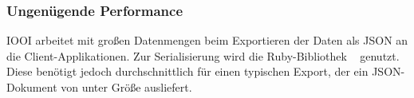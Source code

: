 \subsubsection{Ungenügende Performance}
\label{sssec:epv_ungenuegende_performance}

IOOI arbeitet mit großen Datenmengen beim Exportieren der Daten als JSON an die
Client-Applikationen.  Zur Serialisierung wird die Ruby-Bibliothek
~\cite{ams} genutzt.  Diese benötigt jedoch
durchschnittlich  für einen typischen Export, der ein JSON-Dokument von
unter  Größe ausliefert.
